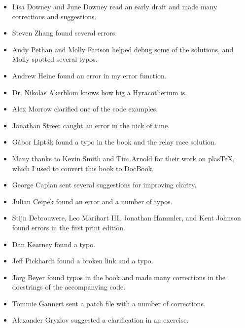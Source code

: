 \begin{itemize}

\item Lisa Downey and June Downey read an early draft and made many
corrections and suggestions.

\item Steven Zhang found several errors.

\item Andy Pethan and Molly Farison helped debug some of the solutions,
and Molly spotted several typos.

\item Andrew Heine found an error in my error function.

\item Dr. Nikolas Akerblom knows how big a Hyracotherium is.

\item Alex Morrow clarified one of the code examples.

\item Jonathan Street caught an error in the nick of time.

\item G\'{a}bor Lipt\'{a}k found a typo in the book and the relay race solution.

\item Many thanks to Kevin Smith and Tim Arnold for their work on
plasTeX, which I used to convert this book to DocBook.

\item George Caplan sent several suggestions for improving clarity.

\item Julian Ceipek found an error and a number of typos.

\item Stijn Debrouwere, Leo Marihart III, Jonathan Hammler, and Kent Johnson
found errors in the first print edition.

\item Dan Kearney found a typo.

\item Jeff Pickhardt found a broken link and a typo.

\item J\"{o}rg Beyer found typos in the book and made many corrections
in the docstrings of the accompanying code.

\item Tommie Gannert sent a patch file with a number of corrections.

\item Alexander Gryzlov suggested a clarification in an exercise.


\end{itemize}
